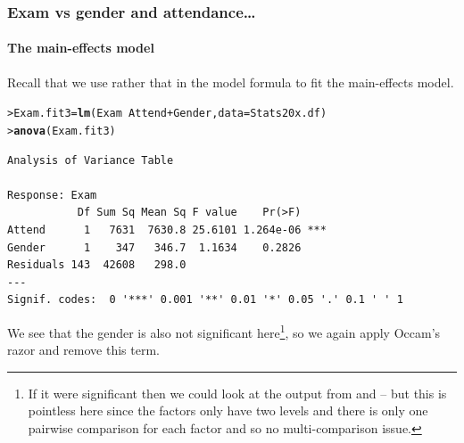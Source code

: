 \documentclass{beamer}\usepackage[]{graphicx}\usepackage[]{xcolor}
\makeatletter
\newcommand{\hlopt}[1]{\textcolor[rgb]{0,0,0}{#1}}%
\newcommand{\hlstd}[1]{\textcolor[rgb]{0.345,0.345,0.345}{#1}}%
\newcommand{\hlkwb}[1]{\textcolor[rgb]{0.69,0.353,0.396}{#1}}%
\newcommand{\hlkwc}[1]{\textcolor[rgb]{0.333,0.667,0.333}{#1}}%
\newcommand{\hlkwd}[1]{\textcolor[rgb]{0.737,0.353,0.396}{\textbf{#1}}}%
\newenvironment{kframe}{%
 \def\at@end@of@kframe{}%
 \ifinner\ifhmode%
  \def\at@end@of@kframe{\end{minipage}}%
  \begin{minipage}{\columnwidth}%
 \fi\fi%
 \def\FrameCommand##1{\hskip\@totalleftmargin \hskip-\fboxsep
 \colorbox{shadecolor}{##1}\hskip-\fboxsep
     \hskip-\linewidth \hskip-\@totalleftmargin \hskip\columnwidth}%
 \MakeFramed {\advance\hsize-\width
   \@totalleftmargin\z@ \linewidth\hsize
   \@setminipage}}%
 {\par\unskip\endMakeFramed%
 \at@end@of@kframe}
\newenvironment{knitrout}{}{} %
\makeatother
\begin{document}
\begin{frame}[fragile]
\frametitle{Exam vs gender and attendance\ldots}
\framesubtitle{The main-effects model}
Recall that we use \rcode{+} rather that \rcode{*} in the model formula to fit the main-effects model.
\medskip

\begin{knitrout}\scriptsize
{}\color{fgcolor}\begin{kframe}
\begin{alltt}
\hlstd{> }\hlstd{Exam.fit3} \hlkwb{=} \hlkwd{lm}\hlstd{(Exam} \hlopt{~} \hlstd{Attend} \hlopt{+} \hlstd{Gender,} \hlkwc{data} \hlstd{= Stats20x.df)}
\hlstd{> }\hlkwd{anova}\hlstd{(Exam.fit3)}
\end{alltt}
\begin{verbatim}
Analysis of Variance Table

Response: Exam
           Df Sum Sq Mean Sq F value    Pr(>F)    
Attend      1   7631  7630.8 25.6101 1.264e-06 ***
Gender      1    347   346.7  1.1634    0.2826    
Residuals 143  42608   298.0                      
---
Signif. codes:  0 '***' 0.001 '**' 0.01 '*' 0.05 '.' 0.1 ' ' 1
\end{verbatim}
\end{kframe}
\end{knitrout}

We see that the gender is also not significant here\footnote{If it were significant then we could look at the output from  and  -- but this is pointless here since the factors only have two levels and there is only one pairwise comparison for each factor and so no multi-comparison issue.}, so we again apply Occam's razor and remove this term.
\end{frame}
\end{document}
